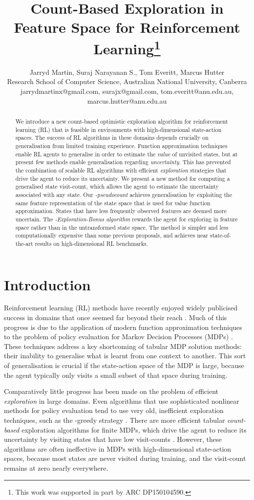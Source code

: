 \documentclass{article}
\title{Count-Based Exploration in Feature Space for Reinforcement Learning\thanks{This work was supported in part by ARC DP150104590.}}
\author{Jarryd Martin, Suraj Narayanan S., Tom Everitt, Marcus Hutter\\
Research School of Computer Science, Australian National University, Canberra\\
jarrydmartinx@gmail.com, surajx@gmail.com, tom.everitt@anu.edu.au, marcus.hutter@anu.edu.au}
\theoremstyle{definition}
\theoremstyle{definition}
\theoremstyle{plain}
\theoremstyle{plain}
\theoremstyle{plain}
\begin{document}
\maketitle
\begin{abstract}
We introduce a new count-based optimistic exploration algorithm for
reinforcement learning (RL) that is feasible in environments with
high-dimensional state-action spaces. The success of RL algorithms
in these domains depends crucially on generalisation from limited
training experience. Function approximation techniques enable RL agents
to generalise in order to estimate the \emph{value} of unvisited states,
but at present few methods enable generalisation regarding\emph{ uncertainty}.
This has prevented the combination of scalable RL algorithms with
efficient \emph{exploration} strategies that drive the agent to reduce
its uncertainty. We present a new method for computing a generalised
state visit-count, which allows the agent to estimate the uncertainty
associated with any state. Our\emph{ -pseudocount} achieves
generalisation by exploiting the same feature representation of the
state space that is used for value function approximation. States
that have less frequently observed features are deemed more uncertain.
The \emph{-Exploration-Bonus algorithm} rewards the agent for
exploring in feature space rather than in the untransformed state
space. The method is simpler and less computationally expensive than
some previous proposals, and achieves near state-of-the-art results
on high-dimensional RL benchmarks.
\end{abstract}

\section{Introduction}

Reinforcement learning (RL) methods have recently enjoyed widely publicised
success in domains that once seemed far beyond their reach \cite{Mnih2015}.
Much of this progress is due to the application of modern function
approximation techniques to the problem of policy evaluation for Markov
Decision Processes (MDPs) \cite{Sutton1998}. These techniques address
a key shortcoming of tabular MDP solution methods: their inability
to generalise what is learnt from one context to another. This sort
of generalisation is crucial if the state-action space of the MDP
is large, because the agent typically only visits a small subset of
that space during training.

Comparatively little progress has been made on the problem of efficient
\emph{exploration} in large domains. Even algorithms that use sophisticated
nonlinear methods for policy evaluation tend to use very old, inefficient
exploration techniques, such as the -greedy strategy \cite{HGS:2016doubleQ,MBMG+2016DQN,DBLP:journals/corr/NairSBAFMPSBPLM15}.
There are more efficient tabular \emph{count-based }exploration algorithms
for finite MDPs, which drive the agent to reduce its uncertainty by
visiting states that have low visit-counts \cite{Strehl2008}. However,
these algorithms are often ineffective in MDPs with high-dimensional
state-action spaces, because most states are never visited during
training, and the visit-count remains at zero nearly everywhere.
\end{document}

